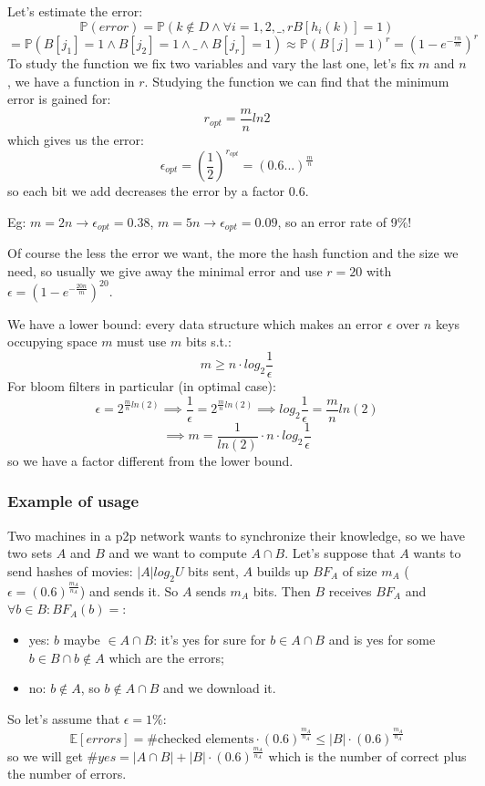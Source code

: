 Let's estimate the error:
$$
    \mathbb{P}(error) = \mathbb{P}(k \notin D \land \forall i =1, 2, \_, r B[h_i(k)] = 1)
$$
$$
    = \mathbb{P}(B[j_1] = 1 \land B[j_2] = 1 \land \_ \land B[j_r] = 1) \approx \mathbb{P}(B[j] = 1)^r = (1 - e^{-\frac{r n}{m}})^r
$$
To study the function we fix two variables and vary the last one, let's fix $m$ and $n$, we have a function in $r$.
Studying the function we can find that the minimum error is gained for:
$$ 
    r_{opt} = \frac{m}{n} ln 2
$$
which gives us the error:
$$
    \epsilon_{opt} = \left( \frac{1}{2} \right)^{r_{opt}} = (0.6...)^{\frac{m}{n}}
$$
so each bit we add decreases the error by a factor 0.6.

Eg: $m = 2n \xrightarrow{} \epsilon_{opt} = 0.38$, $m = 5n \xrightarrow{} \epsilon_{opt} = 0.09$, so an error rate of 9\%!

Of course the less the error we want, the more the hash function and the size we need, so usually we give away the minimal error and use $r = 20$ with $\epsilon = \left( 1 - e^{- \frac{20n}{m}} \right)^{20}$.

We have a lower bound: every data structure which makes an error $\epsilon$ over $n$ keys occupying space $m$ must use $m$ bits s.t.:
$$
    m \geq n \cdot log_2 \frac{1}{\epsilon}
$$
For bloom filters in particular (in optimal case):
$$
    \epsilon =2^{\frac{m}{n} ln(2)} \implies \frac{1}{\epsilon} = 2^{\frac{m}{n} ln(2)} \implies log_2 \frac{1}{\epsilon} = \frac{m}{n} ln(2)
$$
$$
    \implies m = \frac{1}{ln(2)} \cdot n \cdot log_2 \frac{1}{\epsilon}
$$
so we have a factor different from the lower bound.

\subsubsection{Example of usage}
Two machines in a p2p network wants to synchronize their knowledge, so we have two sets $A$ and $B$ and we want to compute $A \cap B$.
Let's suppose that $A$ wants to send hashes of movies: $|A| log_2 U$ bits sent, $A$ builds up $BF_A$ of size $m_A$ ($\epsilon = (0.6)^{\frac{m_A}{n_A}}$) and sends it.
So $A$ sends $m_A$ bits.
Then $B$ receives $BF_A$ and $\forall b \in B : BF_A(b) =$:
\begin{itemize}
    \item yes: $b$ maybe $\in A \cap B$: it's yes for sure for $b \in A \cap B$ and is yes for some $b \in B \cap b \notin A$ which are the errors;
    \item no: $b \notin A$, so $b \notin A \cap B$ and we download it.
\end{itemize}
So let's assume that $\epsilon = 1\%$:
$$
    \mathbb{E}[errors] = \#\text{checked elements} \cdot (0.6)^{\frac{m_A}{n_A}} \leq |B|\cdot(0.6)^{\frac{m_A}{n_A}}
$$
so we will get $\#yes = |A \cap B| + |B|\cdot(0.6)^{\frac{m_A}{n_A}}$ which is the number of correct plus the number of errors.

